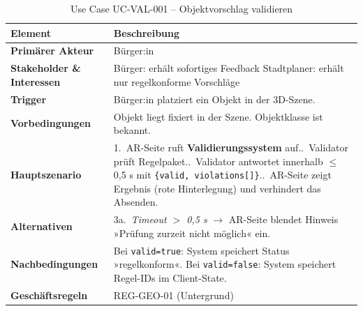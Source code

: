 \begin{table}[h]
\centering
\begin{tabular}{| p{4cm} | p{11cm} |}
\hline
\textbf{Element} & \textbf{Beschreibung} \\
\hline\hline
\textbf{Primärer Akteur} & Bürger:in \\
\hline
\textbf{Stakeholder \& Interessen} & Bürger: erhält sofortiges Feedback\newline
Stadtplaner: erhält nur regelkonforme Vorschläge \\
\hline
\textbf{Trigger} & Bürger:in platziert ein Objekt in der 3D-Szene. \\
\hline
\textbf{Vorbedingungen} & Objekt liegt fixiert in der Szene.\newline
Objektklasse ist bekannt. \\
\hline
\textbf{Hauptszenario} & 1.\ AR-Seite ruft \textbf{Validierungssystem} auf.\newline
2.\ Validator prüft Regelpaket.\newline
3.\ Validator antwortet innerhalb $\leq$ 0,5 s mit \verb|{valid, violations[]}|.\newline
4.\ AR-Seite zeigt Ergebnis (rote Hinterlegung) und verhindert das Absenden. \\
\hline
\textbf{Alternativen} & 3a.\ \textit{Timeout $>$ 0,5 s} $\rightarrow$ AR-Seite blendet Hinweis »Prüfung zurzeit nicht möglich« ein. \\
\hline
\textbf{Nachbedingungen} & Bei \verb|valid=true|: System speichert Status »regelkonform«.\newline
Bei \verb|valid=false|: System speichert Regel-IDs im Client-State. \\
\hline
\textbf{Geschäftsregeln} & REG-GEO-01 (Untergrund) \\
\hline
\end{tabular}
\caption{Use Case UC-VAL-001 – Objektvorschlag validieren}
\label{tab:UC-VAL-001}
\end{table}

\FloatBarrier

